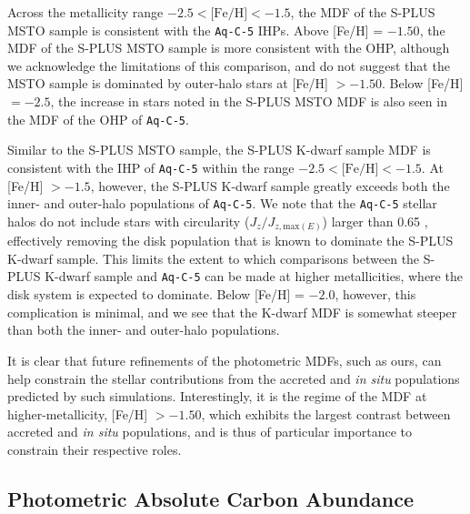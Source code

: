 \documentclass[twocolumn,trackchanges]{aastex63}
\begin{document}
Across the metallicity range $-2.5 < \textrm{[Fe/H]} < -1.5$, the MDF of the S-PLUS MSTO sample is consistent with the \texttt{Aq-C-5} IHPs. Above [Fe/H] = $-1.50$, the MDF of the S-PLUS MSTO sample is more consistent with the OHP, although we acknowledge the limitations of this comparison, and do not suggest that the MSTO sample is dominated by outer-halo stars at [Fe/H] $>-1.50$. Below [Fe/H] $= -2.5$, the increase in stars noted in the S-PLUS MSTO MDF is also seen in the MDF of the OHP of \texttt{Aq-C-5}.

Similar to the S-PLUS MSTO sample, the S-PLUS K-dwarf sample MDF is consistent with the IHP of \texttt{Aq-C-5} within the range $-2.5 < \textrm{[Fe/H]} < -1.5$. At [Fe/H] $> -1.5$, however, the S-PLUS K-dwarf sample greatly exceeds both the inner- and outer-halo populations of \texttt{Aq-C-5}. We note that the \texttt{Aq-C-5} stellar halos do not include stars with circularity ($J_z/J_{z,\textrm{max}(E)}$) larger than 0.65 \citep[see][for details]{Tissera:2013}, effectively removing the disk population that is known to dominate the S-PLUS K-dwarf sample. This limits the extent to which comparisons between the S-PLUS K-dwarf sample and \texttt{Aq-C-5} can be made at higher metallicities, where the disk system is expected to dominate. Below [Fe/H] = $-2.0$, however, this complication is minimal, and we see that the K-dwarf MDF is somewhat steeper than both the inner- and outer-halo populations.

It is clear that future refinements of the photometric MDFs, such as ours, can help constrain the stellar contributions from the accreted and {\it in situ} populations predicted by such simulations. Interestingly, it is the regime of the MDF at higher-metallicity, [Fe/H] $>-1.50$, which exhibits the largest contrast between accreted and \textit{in situ} populations, and is thus of particular importance to constrain their respective roles.\\

\subsection{Photometric Absolute Carbon Abundance}
\end{document}
